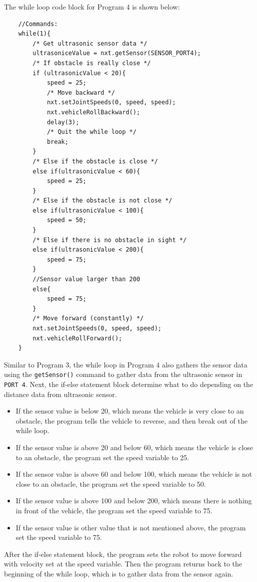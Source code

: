 The while loop code block for Program 4 is shown below:
\begin{verbatim}
    //Commands:
    while(1){
        /* Get ultrasonic sensor data */
        ultrasoniceValue = nxt.getSensor(SENSOR_PORT4);
        /* If obstacle is really close */
        if (ultrasonicValue < 20){
            speed = 25;
            /* Move backward */
            nxt.setJointSpeeds(0, speed, speed);
            nxt.vehicleRollBackward();
            delay(3);
            /* Quit the while loop */
            break;
        }
        /* Else if the obstacle is close */
        else if(ultrasonicValue < 60){
            speed = 25;
        }
        /* Else if the obstacle is not close */
        else if(ultrasonicValue < 100){
            speed = 50;
        }
        /* Else if there is no obstacle in sight */
        else if(ultrasonicValue < 200){
            speed = 75;
        }
        //Sensor value larger than 200
        else{
            speed = 75;
        }
        /* Move forward (constantly) */
        nxt.setJointSpeeds(0, speed, speed);
        nxt.vehicleRollForward();
    }
\end{verbatim}
\noindent
Similar to Program 3, the while loop in Program 4 also gathers the sensor data using the
    \verb+getSensor()+ command to gather data from the ultrasonic sensor in \verb+PORT 4+.
Next, the if-else statement block determine what to do depending on the distance data from ultrasonic sensor.
\begin{itemize}
\item If the sensor value is below 20, which means the vehicle is very close to an obstacle, the program tells the
    vehicle to reverse, and then break out of the while loop.
\item If the sensor value is above 20 and below 60, which means the vehicle is close to an obstacle, the
    program set the speed variable to 25.
\item If the sensor value is above 60 and below 100, which means the vehicle is not close to an obstacle, the
    program set the speed variable to 50.
\item If the sensor value is above 100 and below 200, which means there is nothing in front of the vehicle,
    the program set the speed variable to 75.
\item If the sensor value is other value that is not mentioned above, the program set the speed variable to 75.
\end{itemize}
After the if-else statement block, the program sets the robot to move forward with velocity set at the speed variable.
Then the program returns back to the beginning of the while loop, which is to gather data from the sensor again.

